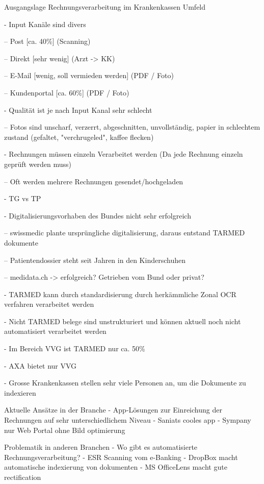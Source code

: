 \documentclass{article}
\begin{document}
\vspace{200pt}

Ausgangslage Rechnungsverarbeitung im Krankenkassen Umfeld

- Input Kanäle sind divers

  -- Post [ca. 40\%] (Scanning)
  
  -- Direkt [sehr wenig] (Arzt -> KK)
  
  -- E-Mail [wenig, soll vermieden werden] (PDF / Foto)
  
  -- Kundenportal [ca. 60\%] (PDF / Foto)

- Qualität ist je nach Input Kanal sehr schlecht

  -- Fotos sind unscharf, verzerrt, abgeschnitten, unvollständig, papier in schlechtem zustand (gefaltet, "verchrugeled", kaffee flecken)

- Rechnungen müssen einzeln Verarbeitet werden (Da jede Rechnung einzeln geprüft werden muss)

  -- Oft werden mehrere Rechnungen gesendet/hochgeladen

- TG vs TP

- Digitalisierungsvorhaben des Bundes nicht sehr erfolgreich

  -- swissmedic plante ursprüngliche digitalisierung, daraus entstand TARMED dokumente

  -- Patientendossier steht seit Jahren in den Kinderschuhen

  -- medidata.ch -> erfolgreich? Getrieben vom Bund oder privat?

- TARMED kann durch standardisierung durch herkämmliche Zonal OCR verfahren verarbeitet werden

- Nicht TARMED belege sind unstrukturiert und können aktuell noch nicht automatisiert verarbeitet werden

- Im Bereich VVG ist TARMED nur ca. 50\%

- AXA bietet nur VVG

- Grosse Krankenkassen stellen sehr viele Personen an, um die Dokumente zu indexieren

Aktuelle Ansätze in der Branche
- App-Lösungen zur Einreichung der Rechnungen auf sehr unterschiedlichem Niveau
  - Saniats cooles app
  - Sympany nur Web Portal ohne Bild optimierung

Problematik in anderen Branchen
- Wo gibt es automatisierte Rechnungsverarbeitung?
- ESR Scanning vom e-Banking
- DropBox macht automatische indexierung von dokumenten
- MS OfficeLens macht gute rectification
\end{document}
